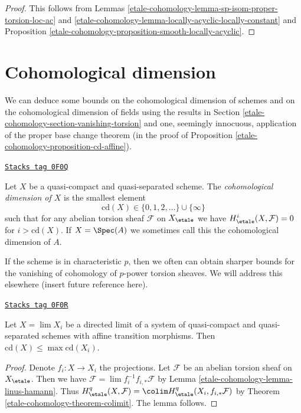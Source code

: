 \begin{proof}
This follows from Lemmas \ref{etale-cohomology-lemma-sp-isom-proper-torsion-loc-ac}
and \ref{etale-cohomology-lemma-locally-acyclic-locally-constant} and
Proposition \ref{etale-cohomology-proposition-smooth-locally-acyclic}.
\end{proof}

\section{Cohomological dimension}
\label{etale-cohomology-section-cd}
We can deduce some bounds on the cohomological dimension of
schemes and on the cohomological dimension of fields using
the results in Section \ref{etale-cohomology-section-vanishing-torsion}
and one, seemingly innocuous, application of the proper base
change theorem (in the proof of Proposition \ref{etale-cohomology-proposition-cd-affine}).

\begin{definition}[Cd]
\label{etale-cohomology-definition-cd}
\href{https://stacks.math.columbia.edu/tag/0F0Q}{\texttt{Stacks tag 0F0Q}}

Let $X$ be a quasi-compact and quasi-separated scheme.
The {\it cohomological dimension of $X$} is the smallest
element
$$
\text{cd}(X) \in \{0, 1, 2, \ldots\} \cup \{\infty\}
$$
such that for any abelian torsion sheaf $\mathcal{F}$
on $X_\etale$ we have $H^i_\etale(X, \mathcal{F}) = 0$
for $i > \text{cd}(X)$. If $X = \Spec(A)$ we sometimes
call this the cohomological dimension of $A$.
\end{definition}

If the scheme is in characteristic $p$, then we often can
obtain sharper bounds for the vanishing of cohomology of
$p$-power torsion sheaves. We will address this elsewhere
(insert future reference here).

\begin{lemma}[Cd limit]
\label{etale-cohomology-lemma-cd-limit}
\href{https://stacks.math.columbia.edu/tag/0F0R}{\texttt{Stacks tag 0F0R}}

Let $X = \lim X_i$ be a directed limit of a system of
quasi-compact and quasi-separated schemes with affine
transition morphisms. Then $\text{cd}(X) \leq \max \text{cd}(X_i)$.
\end{lemma}

\begin{proof}
Denote $f_i : X \to X_i$ the projections.
Let $\mathcal{F}$ be an abelian torsion sheaf on $X_\etale$.
Then we have $\mathcal{F} = \lim f_i^{-1}f_{i, *}\mathcal{F}$
by Lemma \ref{etale-cohomology-lemma-linus-hamann}.
Thus $H^q_\etale(X, \mathcal{F}) =
\colim H^q_\etale(X_i, f_{i, *}\mathcal{F})$
by Theorem \ref{etale-cohomology-theorem-colimit}.
The lemma follows.
\end{proof}

